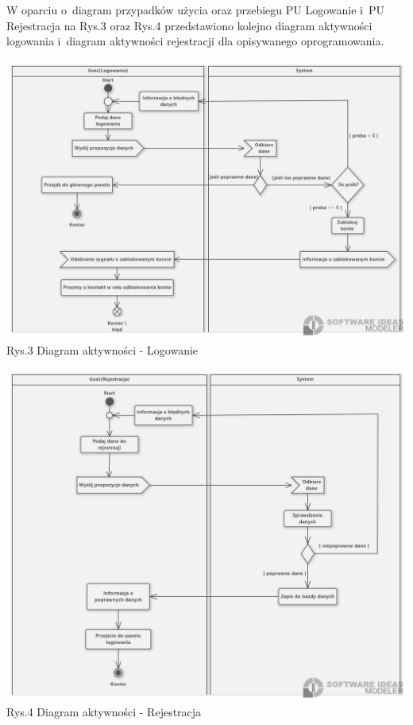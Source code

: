\documentclass[12pt, letterpaper]{article}
\begin{document}
		W oparciu o~diagram przypadków użycia oraz przebiegu PU Logowanie i~PU Rejestracja na Rys.3 oraz Rys.4 przedstawiono kolejno diagram aktywności logowania i~diagram aktywności rejestracji dla opisywanego oprogramowania.
		
		
		\begin{center}
			\includegraphics[scale=0.5]{aclogowanie}\\
			\caption{Rys.3 Diagram aktywności - Logowanie}
		\end{center}	
		
		
		\begin{center}
			\includegraphics[scale=0.5]{acrejestracja}\\
			\caption{Rys.4 Diagram aktywności - Rejestracja}
		\end{center}
		
\end{document}
